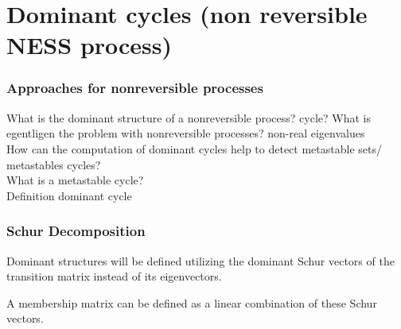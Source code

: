\section{Dominant cycles (non reversible NESS process)}

\subsubsection*{Approaches for nonreversible processes}
What is the dominant structure of a nonreversible process? cycle?
What is egentligen the problem with nonreversible processes? non-real eigenvalues
\\

How can the computation of dominant cycles help to detect metastable sets/ metastables cycles?
\\

What is a metastable cycle?
\\

Definition dominant cycle

\subsubsection*{Schur Decomposition}
Dominant structures will be defined utilizing the dominant Schur vectors
of the transition matrix instead of its eigenvectors.

A membership matrix can be defined as a linear combination of these Schur vectors.